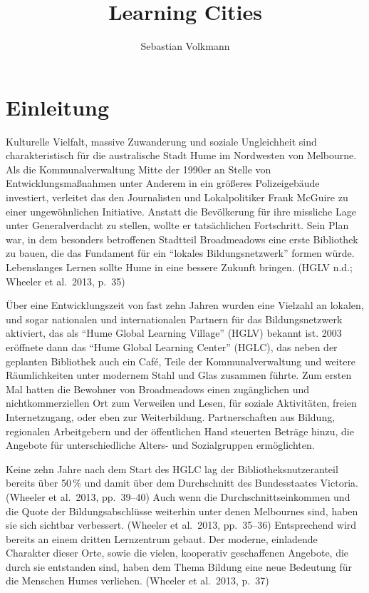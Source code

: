 \documentclass[a4paper,
fontsize=11pt,
oneside,
numbers=noperiodatend,
parskip=half-,
bibliography=totoc,
final
]{scrartcl}
\title{\LARGE{Learning Cities}} %
\author{Sebastian Volkmann} %
\date{}
\begin{document}
\maketitle
\thispagestyle{fancyplain} 


\hypertarget{einleitung}{%
\section*{Einleitung}\label{einleitung}}

Kulturelle Vielfalt, massive Zuwanderung und soziale Ungleichheit sind
charakteristisch für die australische Stadt Hume im Nordwesten von
Melbourne. Als die Kommunalverwaltung Mitte der 1990er an Stelle von
Entwicklungsmaßnahmen unter Anderem in ein größeres Polizeigebäude
investiert, verleitet das den Journalisten und Lokalpolitiker Frank
McGuire zu einer ungewöhnlichen Initiative. Anstatt die Bevölkerung für
ihre missliche Lage unter Generalverdacht zu stellen, wollte er
tatsächlichen Fortschritt. Sein Plan war, in dem besonders betroffenen
Stadtteil Broadmeadows eine erste Bibliothek zu bauen, die das Fundament
für ein \enquote{lokales Bildungsnetzwerk} formen würde. Lebenslanges
Lernen sollte Hume in eine bessere Zukunft bringen. (HGLV n.d.; Wheeler
et al.~2013, p.~35)

Über eine Entwicklungszeit von fast zehn Jahren wurden eine Vielzahl an
lokalen, und sogar nationalen und internationalen Partnern für das
Bildungsnetzwerk aktiviert, das als \enquote{Hume Global Learning
Village} (HGLV) bekannt ist. 2003 eröffnete dann das \enquote{Hume
Global Learning Center} (HGLC), das neben der geplanten Bibliothek auch
ein Café, Teile der Kommunalverwaltung und weitere Räumlichkeiten unter
modernem Stahl und Glas zusammen führte. Zum ersten Mal hatten die
Bewohner von Broadmeadows einen zugänglichen und nichtkommerziellen Ort
zum Verweilen und Lesen, für soziale Aktivitäten, freien Internetzugang,
oder eben zur Weiterbildung. Partnerschaften aus Bildung, regionalen
Arbeitgebern und der öffentlichen Hand steuerten Beträge hinzu, die
Angebote für unterschiedliche Alters- und Sozialgruppen ermöglichten.

Keine zehn Jahre nach dem Start des HGLC lag der Bibliotheksnutzeranteil
bereits über 50\,\% und damit über dem Durchschnitt des Bundesstaates
Victoria. (Wheeler et al.~2013, pp.~39--40) Auch wenn die
Durchschnittseinkommen und die Quote der Bildungsabschlüsse weiterhin
unter denen Melbournes sind, haben sie sich sichtbar verbessert.
(Wheeler et al.~2013, pp.~35--36) Entsprechend wird bereits an einem
dritten Lernzentrum gebaut. Der moderne, einladende Charakter dieser
Orte, sowie die vielen, kooperativ geschaffenen Angebote, die durch sie
entstanden sind, haben dem Thema Bildung eine neue Bedeutung für die
Menschen Humes verliehen. (Wheeler et al.~2013, p.~37)
\end{document}
